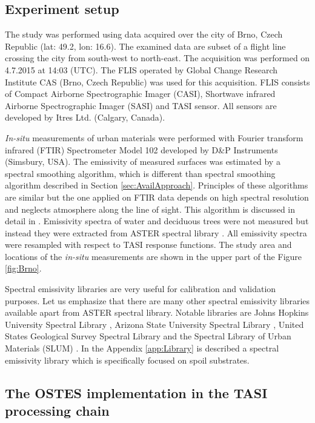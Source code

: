 \subsection*{Experiment setup}

The study was performed using data acquired over the city of Brno, Czech Republic (lat: 49.2, lon: 16.6). The examined data are subset of a flight line crossing the city from south-west to north-east. The acquisition was performed on 4.7.2015 at 14:03 (UTC). The FLIS operated by Global Change Research Institute CAS (Brno, Czech Republic) \cite{HF14} was used for this acquisition. FLIS consists of Compact Airborne Spectrographic Imager (CASI), Shortwave infrared Airborne Spectrographic Imager (SASI) and TASI sensor. All sensors are developed by Itres Ltd. (Calgary, Canada).

\textit{In-situ} measurements of urban materials were performed with Fourier transform infrared (FTIR) Spectrometer Model 102 developed by D\&P Instruments (Simsbury, USA). The emissivity of measured surfaces was estimated by a spectral smoothing algorithm, which is different than spectral smoothing algorithm described in Section \ref{sec:AvailApproach}. Principles of these algorithms are similar but the one applied on FTIR data depends on high spectral resolution and neglects atmosphere along the line of sight. This algorithm is discussed in detail in \cite{HJ98}. Emissivity spectra of water and deciduous trees were not measured but instead they were extracted from ASTER spectral library \cite{BH09}. All emissivity spectra were resampled with respect to TASI response functions. The study area and locations of the \textit{in-situ} measurements are shown in the upper part of the Figure \ref{fig:Brno}. 

Spectral emissivity libraries are very useful for calibration and validation purposes. Let us emphasize that there are many other spectral emissivity libraries available apart from ASTER spectral library. Notable libraries are Johns Hopkins University Spectral Library \cite{SW91}, Arizona State University Spectral Library \cite{CB00}, United States Geological Survey Spectral Library \cite{CS16} and the Spectral Library of Urban Materials (SLUM) \cite{KS14}. In the Appendix \ref{app:Library} is described a spectral emissivity library which is specifically focused on spoil substrates.

\subsection*{The OSTES implementation in the TASI processing chain}

